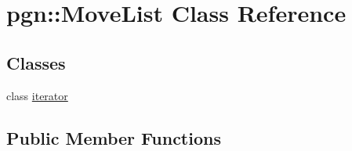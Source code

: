 \hypertarget{classpgn_1_1MoveList}{
\section{pgn::MoveList Class Reference}
\label{classpgn_1_1MoveList}
}
\subsection*{Classes}
\begin{DoxyCompactItemize}
\item 
class \hyperlink{classpgn_1_1MoveList_1_1iterator}{iterator}
\end{DoxyCompactItemize}
\subsection*{Public Member Functions}
